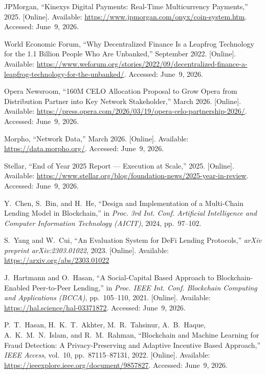 \documentclass[12pt, a4paper]{report}
\begin{document}
{\begin{enumerate}[label={[\arabic*]}]
\item JPMorgan, ``Kinexys Digital Payments: Real-Time Multicurrency Payments,'' 2025. [Online]. Available: \url{https://www.jpmorgan.com/onyx/coin-system.htm}. Accessed: June~9, 2026.

\item World Economic Forum, ``Why Decentralized Finance Is a Leapfrog Technology for the 1.1 Billion People Who Are Unbanked,'' September 2022. [Online]. Available: \url{https://www.weforum.org/stories/2022/09/decentralized-finance-a-leapfrog-technology-for-the-unbanked/}. Accessed: June~9, 2026.

\item Opera Newsroom, ``160M CELO Allocation Proposal to Grow Opera from Distribution Partner into Key Network Stakeholder,'' March 2026. [Online]. Available: \url{https://press.opera.com/2026/03/19/opera-celo-partnership-2026/}. Accessed: June~9, 2026.

\item Morpho, ``Network Data,'' March 2026. [Online]. Available: \url{https://data.morpho.org/}. Accessed: June~9, 2026.

\item Stellar, ``End of Year 2025 Report --- Execution at Scale,'' 2025. [Online]. Available: \url{https://www.stellar.org/blog/foundation-news/2025-year-in-review}. Accessed: June~9, 2026.

\item Y.~Chen, S.~Bin, and H.~He, ``Design and Implementation of a Multi-Chain Lending Model in Blockchain,'' in \textit{Proc. 3rd Int. Conf. Artificial Intelligence and Computer Information Technology (AICIT)}, 2024, pp.~97--102.

\item S.~Yang and W.~Cui, ``An Evaluation System for DeFi Lending Protocols,'' \textit{arXiv preprint arXiv:2303.01022}, 2023. [Online]. Available: \url{https://arxiv.org/abs/2303.01022}

\item J.~Hartmann and O.~Hasan, ``A Social-Capital Based Approach to Blockchain-Enabled Peer-to-Peer Lending,'' in \textit{Proc. IEEE Int. Conf. Blockchain Computing and Applications (BCCA)}, pp.~105--110, 2021. [Online]. Available: \url{https://hal.science/hal-03371872}. Accessed: June~9, 2026.

\item P.~T.~Hasan, H.~K.~T.~Akhter, M.~R.~Tahsinur, A.~B.~Haque, A.~K.~M.~N.~Islam, and R.~M.~Rahman, ``Blockchain and Machine Learning for Fraud Detection: A Privacy-Preserving and Adaptive Incentive Based Approach,'' \textit{IEEE Access}, vol.~10, pp.~87115--87131, 2022. [Online]. Available: \url{https://ieeexplore.ieee.org/document/9857827}. Accessed: June~9, 2026.


\end{enumerate}}
\end{document}
